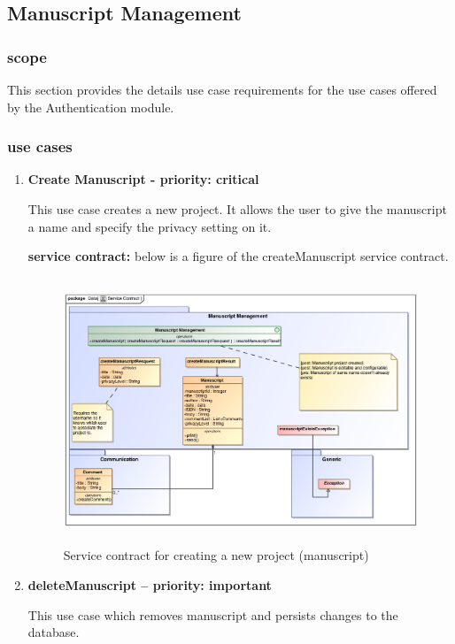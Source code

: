 \documentclass[12pt]{article}
\begin{document}
\subsection{Manuscript Management}

\subsubsection{scope}
\par{This section provides the details use case requirements for the use cases offered by the Authentication
module.}

\subsubsection{use cases}

\begin{enumerate}
\item \textbf{Create Manuscript - priority: critical}\\
\par{This use case creates a new project. It allows the user to give the manuscript a name and specify the privacy setting on it. }

\textbf{service contract:} below is a figure of the createManuscript service contract.

\begin{figure}[h]
\includegraphics[height=300px, width=500px]{epsImages/ManuscriptManagement/createManuscriptServiceContract.eps}
\caption{Service contract for creating a new project (manuscript)}
\end{figure}


\item \textbf{deleteManuscript – priority: important}\\
\par{This use case which removes manuscript and persists changes to the database. }


\end{enumerate}
\end{document}
